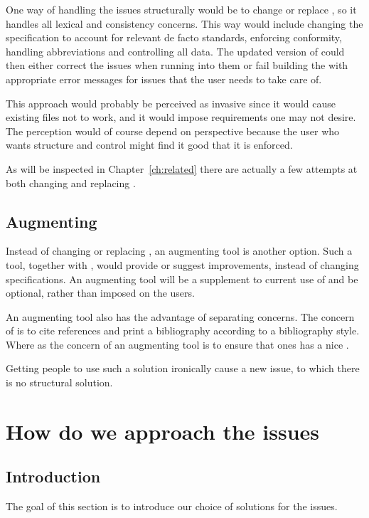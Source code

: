 One way of handling the issues structurally would be to change or
replace {\bibtex}, so it handles all lexical and consistency concerns.
This way would include changing the {\bibtex} specification to account
for relevant de facto standards, enforcing conformity, handling
abbreviations and controlling all data.  The updated version of
{\bibtex} could then either correct the issues when running into them
or fail building the  with appropriate error messages for
issues that the user needs to take care of.

This approach would probably be perceived as invasive since it would
cause existing {\bibtex} files not to work, and it would impose
requirements one may not desire.  The perception would of course
depend on perspective because the user who wants structure and control
might find it good that it is enforced.

As will be inspected in Chapter~\ref{ch:related} there are actually a
few attempts at both changing and replacing {\bibtex}.


\subsection{Augmenting {\bibtex}}

Instead of changing or replacing {\bibtex}, an augmenting tool is
another option.  Such a tool, together with {\bibtex}, would provide
or suggest improvements, instead of changing specifications.  An
augmenting tool will be a supplement to current use of {\bibtex} and
be optional, rather than imposed on the users.

An augmenting tool also has the advantage of separating concerns.  The
concern of {\bibtex} is to cite references and print a bibliography
according to a bibliography style.  Where as the concern of an
augmenting tool is to ensure that ones has a nice .

Getting people to use such a solution ironically cause a new issue, to
which there is no structural solution.

\section{How do we approach the {\bibtex} issues}
\subsection{Introduction}

The goal of this section is to introduce our choice of solutions for
the issues.


